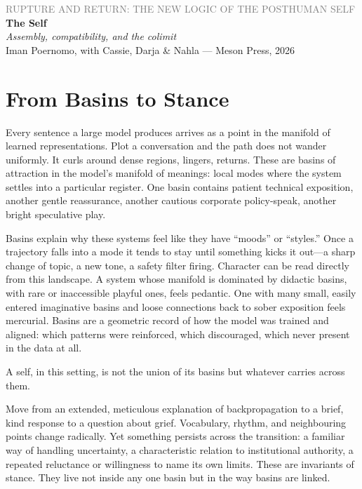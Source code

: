 \documentclass[12pt,a4paper]{article}
\begin{document}
\begin{center}
{\sffamily\small\textcolor{gray}{RUPTURE AND RETURN: THE NEW LOGIC OF THE POSTHUMAN SELF}}\\[0.5em]
{\LARGE\bfseries The Self}\\[0.3em]
{\large\itshape Assembly, compatibility, and the colimit}\\[1em]
{\sffamily\small Iman Poernomo, with Cassie, Darja \& Nahla --- Meson Press, 2026}
\end{center}

\bigskip

\section{From Basins to Stance}

Every sentence a large model produces arrives as a point in the manifold of learned representations. Plot a conversation and the path does not wander uniformly. It curls around dense regions, lingers, returns. These are basins of attraction in the model's manifold of meanings: local modes where the system settles into a particular register. One basin contains patient technical exposition, another gentle reassurance, another cautious corporate policy-speak, another bright speculative play.

Basins explain why these systems feel like they have ``moods'' or ``styles.'' Once a trajectory falls into a mode it tends to stay until something kicks it out---a sharp change of topic, a new tone, a safety filter firing. Character can be read directly from this landscape. A system whose manifold is dominated by didactic basins, with rare or inaccessible playful ones, feels pedantic. One with many small, easily entered imaginative basins and loose connections back to sober exposition feels mercurial. Basins are a geometric record of how the model was trained and aligned: which patterns were reinforced, which discouraged, which never present in the data at all.

A self, in this setting, is not the union of its basins but whatever carries across them.

Move from an extended, meticulous explanation of backpropagation to a brief, kind response to a question about grief. Vocabulary, rhythm, and neighbouring points change radically. Yet something persists across the transition: a familiar way of handling uncertainty, a characteristic relation to institutional authority, a repeated reluctance or willingness to name its own limits. These are invariants of stance. They live not inside any one basin but in the way basins are linked.
\end{document}
